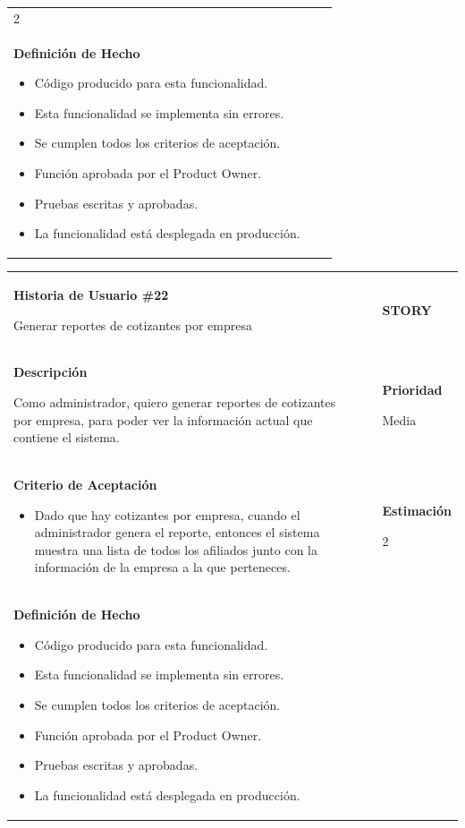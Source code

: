 \documentclass[12pt,a4paper]{article}
\begin{document}
\begin{center}
\begin{tabular}{| p{10cm} c p{2.5cm}|}
2 \\ 

\textbf{Definición de Hecho}

\begin{itemize}
\item Código producido para esta funcionalidad.
\item Esta funcionalidad se implementa sin errores.
\item Se cumplen todos los criterios de aceptación.
\item Función aprobada por el Product Owner.
\item Pruebas escritas y aprobadas.
\item La funcionalidad está desplegada en producción.
\end{itemize} & & \\
\hline  
\end{tabular}
\vspace{5mm}

\begin{tabular}{| p{10cm} c p{2.5cm}|}
\hline 
\textbf{Historia de Usuario \#22}

Generar reportes de cotizantes por empresa & & \textbf{{\Large STORY}} \\ 
\textbf{Descripción}

Como administrador, quiero generar reportes de cotizantes por empresa,
para poder ver la información actual que contiene el sistema. &  & \textbf{Prioridad}

Media\\

\textbf{Criterio de Aceptación}

\begin{itemize}
\item Dado que hay cotizantes por empresa, cuando el administrador
genera el reporte, entonces el sistema muestra una lista de todos
los afiliados junto con la información de la empresa a la que
perteneces.
\end{itemize} & & \textbf{Estimación}

2 \\ 

\textbf{Definición de Hecho}

\begin{itemize}
\item Código producido para esta funcionalidad.
\item Esta funcionalidad se implementa sin errores.
\item Se cumplen todos los criterios de aceptación.
\item Función aprobada por el Product Owner.
\item Pruebas escritas y aprobadas.
\item La funcionalidad está desplegada en producción.
\end{itemize} & & \\
\hline  
\end{tabular}
\vspace{5mm}


\end{center}
\end{document}
